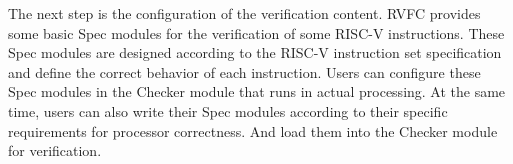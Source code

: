 \documentclass[conference]{IEEEtran}
\theoremstyle{definition}
\begin{document}
The next step is the configuration of the verification content.
RVFC provides some basic Spec modules for the verification of some RISC-V instructions.
These Spec modules are designed according to the RISC-V instruction set specification and define the correct behavior of each instruction.
Users can configure these Spec modules in the Checker module that runs in actual processing.
At the same time, users can also write their Spec modules according to their specific requirements for processor correctness.
And load them into the Checker module for verification.
\end{document}
